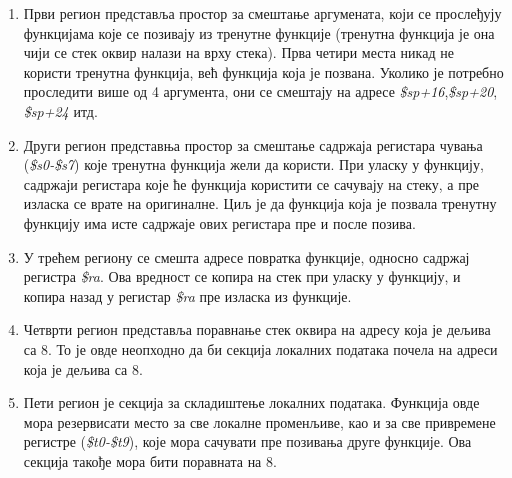 \documentclass[12pt,oneside]{memoir}
\begin{document}
\begin{enumerate}

\item Први регион представља простор за смештање аргумената, који се прослеђују функцијама које се позивају из тренутне функције (тренутна функција је она чији се стек оквир налази на врху стека). Прва четири места никад не користи тренутна функција, већ функција која је позвана. Уколико је потребно проследити више од 4 аргумента, они се смештају на адресе \textit{\$sp+16},\textit{\$sp+20}, \textit{\$sp+24} итд.

\item Други регион представња простор за смештање садржаја регистара чувања (\textit{\$s0-\$s7}) које тренутна функција жели да користи. При уласку у функцију, садржаји регистара које ће функција користити се сачувају на стеку, а пре изласка се врате на оригиналне. Циљ је да функција која је позвала тренутну функцију има исте садржаје ових регистара пре и после позива.

\item У трећем региону се смешта адресе повратка функције, односно садржај регистра \textit{\$ra}. Ова вредност се копира на стек при уласку у функцију, и копира назад у регистар  \textit{\$ra} пре изласка из функције.

\item Четврти регион представља поравнање стек оквира на адресу која је дељива са 8. То је овде неопходно да би секција локалних података почела на адреси која је дељива са 8.

\item Пети регион је секција за складиштење локалних података. Функција овде мора резервисати место за све локалне променљиве, као и за све привремене регистре (\textit{\$t0-\$t9}), које мора сачувати пре позивања друге функције. Ова секција такође мора бити поравната на 8.
\end{enumerate}
\end{document}
